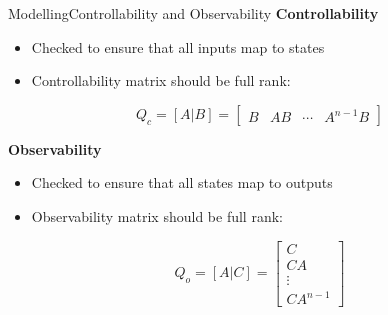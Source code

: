 



\begin{frame}{Modelling}{Controllability and Observability}
	\textbf{Controllability}
	\begin{itemize}
		\item Checked to ensure that all inputs map to states
		\item Controllability matrix should be full rank:
	\end{itemize}
	\begin{equation} \label{eq:ctrb}
		Q_c = [A|B] = \begin{bmatrix}  B & AB & \cdots & A^{n-1}B  \end{bmatrix}
	\end{equation}

	\textbf{Observability}
	\begin{itemize}
		\item Checked to ensure that all states map to outputs
		\item Observability matrix should be full rank:
	\end{itemize}
	\begin{equation}
		Q_o = [A|C] = \begin{bmatrix}
			C \\ CA \\ \vdots \\ CA^{n-1}
		\end{bmatrix}
	\end{equation}
\end{frame}



